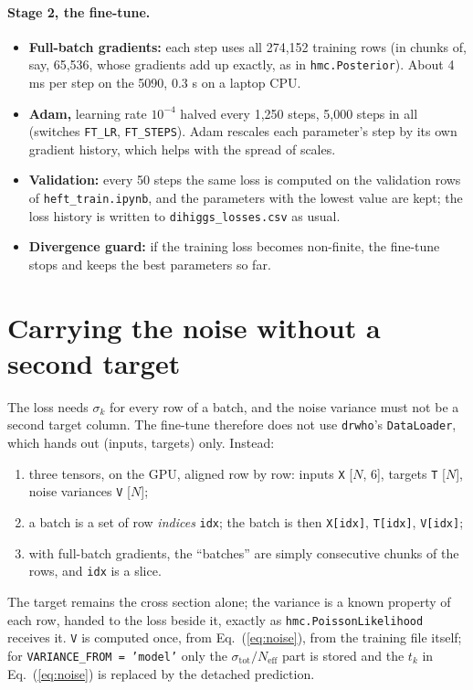 \documentclass[11pt]{article}
\newcommand{\file}[1]{\nolinkurl{#1}}
\newcommand{\code}[1]{\texttt{#1}}
\begin{document}
\paragraph{Stage 2, the fine-tune.}
\begin{itemize}
  \item \textbf{Full-batch gradients:} each step uses all 274,152 training rows (in chunks
    of, say, 65,536, whose gradients add up exactly, as in \code{hmc.Posterior}). About 4
    ms per step on the 5090, 0.3 s on a laptop CPU.
  \item \textbf{Adam,} learning rate $10^{-4}$ halved every 1,250 steps, 5,000 steps in all
    (switches \code{FT\_LR}, \code{FT\_STEPS}). Adam rescales each parameter's step by its
    own gradient history, which helps with the spread of scales.
  \item \textbf{Validation:} every 50 steps the same loss is computed on the validation rows
    of \file{heft_train.ipynb}, and the parameters with the lowest value are kept; the loss
    history is written to \file{dihiggs_losses.csv} as usual.
  \item \textbf{Divergence guard:} if the training loss becomes non-finite, the fine-tune
    stops and keeps the best parameters so far.
\end{itemize}

\section{Carrying the noise without a second target}
\label{sec:carry}

The loss needs $\sigma_k$ for every row of a batch, and the noise variance must not be a
second target column. The fine-tune therefore does not use \code{drwho}'s
\code{DataLoader}, which hands out (inputs, targets) only. Instead:
\begin{enumerate}
  \item three tensors, on the GPU, aligned row by row: inputs \code{X} [$N$, 6], targets
    \code{T} [$N$], noise variances \code{V} [$N$];
  \item a batch is a set of row \emph{indices} \code{idx}; the batch is then
    \code{X[idx]}, \code{T[idx]}, \code{V[idx]};
  \item with full-batch gradients, the ``batches'' are simply consecutive chunks of the
    rows, and \code{idx} is a slice.
\end{enumerate}
The target remains the cross section alone; the variance is a known property of each row,
handed to the loss beside it, exactly as \code{hmc.PoissonLikelihood} receives it.
\code{V} is computed once, from Eq.~(\ref{eq:noise}), from the training file itself; for
\code{VARIANCE\_FROM = 'model'} only the $\sigma_\text{tot}/N_\text{eff}$ part is stored and
the $t_k$ in Eq.~(\ref{eq:noise}) is replaced by the detached prediction.
\end{document}
